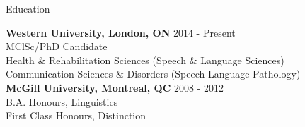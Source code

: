 \documentclass{resume} %
\begin{document}

\begin{rSection}{Education}

{\bf Western University, London, ON} \hfill {2014 - Present} \\ 
MClSc/PhD Candidate\\
Health \& Rehabilitation Sciences (Speech \& Language Sciences) \\ 
Communication Sciences \& Disorders (Speech-Language Pathology) \bigskip \\
{\bf McGill University, Montreal, QC} \hfill {2008 - 2012} \\
B.A. Honours, Linguistics \\
First Class Honours, Distinction

\end{rSection}

\end{document}
